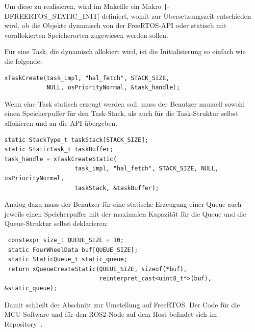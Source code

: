 Um diese zu realisieren, wird im Makefile ein Makro
\texttt|-DFREERTOS_STATIC_INIT| definiert, womit zur Übersetzungszeit
entschieden wird, ob die Objekte dynamisch von der FreeRTOS-API oder statisch
mit vorallokierten Speicherorten zugewiesen werden sollen.

Für eine Task, die dynamisch allokiert wird, ist die Initialisierung so einfach
wie die folgende:

\begin{code}
\begin{verbatim}
xTaskCreate(task_impl, "hal_fetch", STACK_SIZE,
            NULL, osPriorityNormal, &task_handle);
\end{verbatim}
\end{code}

Wenn eine Task statisch erzeugt werden soll, muss der Benutzer manuell sowohl
einen Speicherpuffer für den Task-Stack, als auch für die Task-Struktur selbst
allokieren und an die API übergeben.

\begin{code}
\begin{verbatim}
static StackType_t taskStack[STACK_SIZE];
static StaticTask_t taskBuffer;
task_handle = xTaskCreateStatic(
                    task_impl, "hal_fetch", STACK_SIZE, NULL, osPriorityNormal,
                    taskStack, &taskBuffer);
\end{verbatim}
\end{code}

Analog dazu muss der Benutzer für eine statische Erzeugung einer Queue auch
jeweils einen Speicherpuffer mit der maximalen Kapazität für die Queue und die
Queue-Struktur selbst deklarieren:

\begin{code}
\begin{verbatim}
 constexpr size_t QUEUE_SIZE = 10;
 static FourWheelData buf[QUEUE_SIZE];
 static StaticQueue_t static_queue;
 return xQueueCreateStatic(QUEUE_SIZE, sizeof(*buf),
                           reinterpret_cast<uint8_t*>(buf), &static_queue);
\end{verbatim}
\end{code}

Damit schließt der Abschnitt zur Umstellung auf FreeRTOS. Der Code für die
MCU-Software und für den ROS2-Node auf dem Host befindet sich im
Repository~\cite{mecarover_freertos_profiling}.

